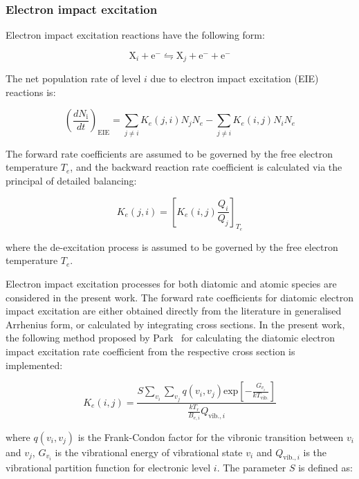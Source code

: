 \subsubsection{Electron impact excitation}

Electron impact excitation reactions have the following form:

\begin{equation}
 \text{X}_i + \text{e}^- \leftrightharpoons  \text{X}_j + \text{e}^- + \text{e}^-
\end{equation}

The net population rate of level $i$ due to electron impact excitation (EIE) reactions is:

\begin{equation}
 \left ( \frac{dN_\text{i}}{dt} \right )_\text{EIE} =  \sum_{j \neq i} K_{e}(j,i) N_{j} N_{e} - \sum_{j \neq i} K_{e} (i,j) N_{i} N_{e} 
\end{equation}

The forward rate coefficients are assumed to be governed by the free electron temperature $T_e$, and the backward reaction rate coefficient is calculated via the principal of detailed balancing:

\begin{equation}
 K_{e}(j,i) = \left [ K_{e}(i,j) \frac{Q_i}{Q_j} \right ]_{T_e}
\end{equation}

\noindent where the de-excitation process is assumed to be governed by the free electron temperature $T_e$.

\par

Electron impact excitation processes for both diatomic and atomic species are considered in the present work.
The forward rate coefficients for diatomic electron impact excitation are either obtained directly from the literature in generalised Arrhenius form, or calculated by integrating cross sections.
In the present work, the following method proposed by Park~\cite{park_1990} for calculating the diatomic electron impact excitation rate coefficient from the respective cross section is implemented:

\begin{equation}
 K_e (i,j) = \frac{S \sum_{v_i} \sum_{v_j} q(v_i, v_j) \text{exp} \left [ - \frac{G_{v_i}}{k T_\text{vib.}} \right ] }{\frac{kT_r}{B_{e,i}} Q_{\text{vib.},i} } \label{eq:within}
\end{equation}

\noindent where $q(v_i, v_j)$ is the Frank-Condon factor for the vibronic transition between $v_i$ and $v_j$, $G_{v_i}$ is the vibrational energy of vibrational state $v_i$ and $Q_{\text{vib.},i}$ is the vibrational partition function for electronic level $i$.
The parameter $S$ is defined as:

